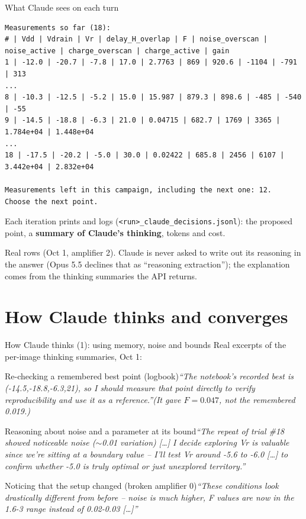\documentclass[aspectratio=169,10pt]{beamer}
\newcommand{\quoteblock}[2]{%
  \begin{block}{#1}\scriptsize\emph{#2}\end{block}}
\begin{document}
\begin{frame}[fragile]{What Claude sees on each turn}
\begin{lstlisting}
Measurements so far (18):
# | Vdd | Vdrain | Vr | delay_H_overlap | F | noise_overscan | noise_active | charge_overscan | charge_active | gain
1 | -12.0 | -20.7 | -7.8 | 17.0 | 2.7763 | 869 | 920.6 | -1104 | -791 | 313
...
8 | -10.3 | -12.5 | -5.2 | 15.0 | 15.987 | 879.3 | 898.6 | -485 | -540 | -55
9 | -14.5 | -18.8 | -6.3 | 21.0 | 0.04715 | 682.7 | 1769 | 3365 | 1.784e+04 | 1.448e+04
...
18 | -17.5 | -20.2 | -5.0 | 30.0 | 0.02422 | 685.8 | 2456 | 6107 | 3.442e+04 | 2.832e+04

Measurements left in this campaign, including the next one: 12.
Choose the next point.
\end{lstlisting}
  \small
  Each iteration prints and logs (\texttt{<run>\_claude\_decisions.jsonl}):
  the proposed point, a \textbf{summary of Claude's thinking}, tokens and cost.

  \vspace{1mm}
  {\scriptsize Real rows (Oct 1, amplifier 2). Claude is never asked to write out its reasoning
   in the answer (Opus 5.5 declines that as ``reasoning extraction''); the explanation comes
   from the thinking summaries the API returns.}
\end{frame}

\section{How Claude thinks and converges}

\begin{frame}{How Claude thinks (1): using memory, noise and bounds}
  \small Real excerpts of the per-image thinking summaries, Oct 1:

  \vspace{1mm}
  \quoteblock{Re-checking a remembered best point (logbook)}{``The notebook's recorded best is
    (-14.5,-18.8,-6.3,21), so I should measure that point directly to verify reproducibility
    and use it as a reference.''\quad (It gave $F = 0.047$, not the remembered 0.019.)}
  \vspace{1mm}
  \quoteblock{Reasoning about noise and a parameter at its bound}{``The repeat of trial \#18
    showed noticeable noise ($\sim$0.01 variation) [\dots] I decide exploring Vr is valuable
    since we're sitting at a boundary value -- I'll test Vr around -5.6 to -6.0 [\dots] to
    confirm whether -5.0 is truly optimal or just unexplored territory.''}
  \vspace{1mm}
  \quoteblock{Noticing that the setup changed (broken amplifier 0)}{``These conditions look
    drastically different from before -- noise is much higher, F values are now in the 1.6-3
    range instead of 0.02-0.03 [\dots]''}
\end{frame}
\end{document}

